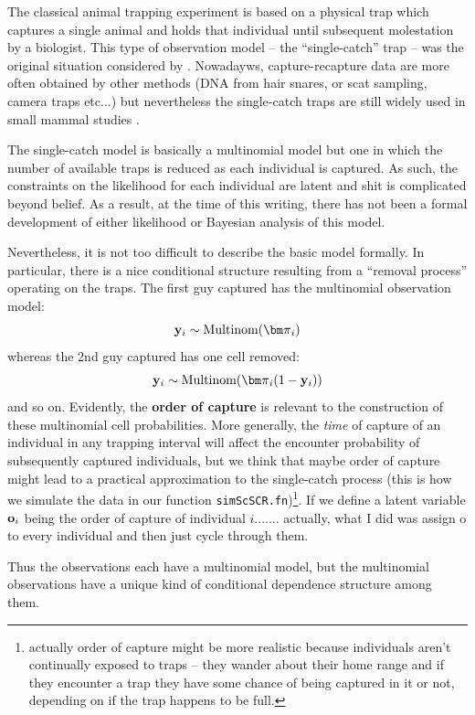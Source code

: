 The classical animal trapping experiment is based on a physical trap
which captures a single animal and holds that individual until
subsequent molestation by a biologist.
This type of observation model -- the ``single-catch'' trap --
was the original situation considered by
\citet{efford:2004}. Nowadayws, capture-recapture data are more often
obtained by other methods (DNA from hair snares, or scat sampling,
camera traps etc...) but nevertheless the single-catch traps are still
widely used in small mammal studies \citep{converse_1996, converse_royle:2012, converse_royle:2013}.

The single-catch model is basically a multinomial model but one in
which the number of available traps is reduced as each individual is
captured. As such, the constraints on the likelihood for each
individual are latent and shit is complicated beyond belief.  As a
result, at the time of this writing, there has not been a formal
development of either likelihood or Bayesian analysis of this model.

Nevertheless, it is not too difficult to describe the basic model
formally. In particular, there is a nice conditional structure
resulting from a ``removal process'' operating on the traps.  The
first guy captured has the multinomial observation model:
\[
{\bf y}_{i} \sim \mbox{Multinom}({\bm \pi}_{i})
\]
whereas the 2nd guy captured has one cell removed:
\[
{\bf y}_{i} \sim \mbox{Multinom}({\bm \pi}_{i}(1-{\bf y}_{i})    )
\]
and so on.  Evidently, the {\bf order of capture} is relevant to the
construction of these multinomial cell probabilities. More generally,
the {\it time} of capture of an individual in any trapping interval
will affect the encounter probability of subsequently captured
individuals, but we think that maybe order of capture might lead to a
practical approximation to the single-catch process (this is how we
simulate the data in our function \mbox{\tt simScSCR.fn})\footnote{actually order of
  capture might be more realistic because individuals aren't
  continually exposed to traps -- they wander about their home range
  and if they encounter a trap they have some chance of being captured
  in it or not, depending on if the trap happens to be full. }.  If we
define a latent variable ${\bf o}_{i}$ being the order of capture of
individual $i$....... actually, what I did was assign o to every
individual and then just cycle through them.

Thus the observations each have a multinomial model, but the
multinomial observations have a unique kind of conditional dependence
structure among them.

